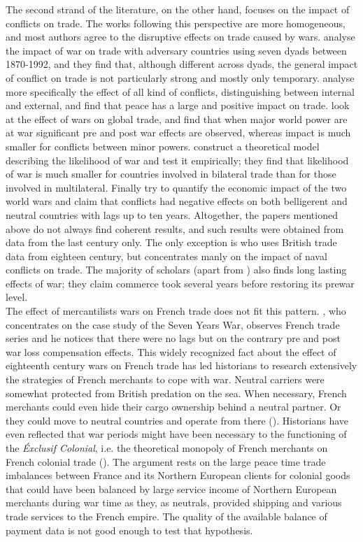 \documentclass[12pt,a4paper,titlepage,english]{article}
\begin{document}
The second strand of the literature, on the other hand, focuses on the impact of conflicts on trade. The works following this perspective are more homogeneous, and most authors agree to the disruptive effects on trade caused by wars. \cite{levy2004trading} analyse the impact of war on trade with adversary countries using seven dyads between 1870-1992, and they find that, although different across dyads, the general impact of conflict on trade is not particularly strong and mostly only temporary. \cite{blomberg2006much} analyse more specifically the effect of all kind of conflicts, distinguishing between internal and external, and find that peace has a large and positive impact on trade. \cite{anderton2001impact} look at the effect of wars on global trade, and find that when major world power are at war significant pre and post war effects are observed, whereas impact is much smaller for conflicts between minor powers. \cite{martin2008make} construct a theoretical model describing the likelihood of war and test it empirically; they find that likelihood of war is much smaller for countries involved in bilateral trade than for those involved in multilateral. Finally \cite{glick2010collateral} try to quantify the economic impact of the two world wars and claim that conflicts had negative effects on both belligerent and neutral countries with lags up to ten years. Altogether, the papers mentioned above do not always find coherent results, and such results were obtained from data from the last century only. The only exception is \cite{rahman2010fighting} who uses British trade data from eighteen century, but concentrates manly on the impact of naval conflicts on trade. The majority of scholars (apart from \cite{levy2004trading}) also finds long lasting effects of war; they claim commerce took several years before restoring its prewar level.\\
The effect of mercantilists wars on French trade does not fit this pattern. \cite{riley_seven_1986}, who concentrates on the case study of the Seven Years War, observes French trade series and he notices that there were no lags but on the contrary pre and post war loss compensation effects. This widely recognized fact about the effect of eighteenth century wars on French trade has led historians to research extensively the strategies of French merchants to cope with war. Neutral carriers were somewhat protected from British predation on the sea. When necessary, French merchants could even hide their cargo ownership behind a neutral partner. Or they could move to neutral countries and operate from there (\cite{marzagalli_was_2016}). Historians have even reflected that war periods might have been necessary to the functioning of the \textit{Éxclusif Colonial}, i.e. the theoretical monopoly of French merchants on French colonial trade (\cite{lespagnol_mondialisation_1997, morineau_vraie_1997, marzagalli_was_2016}). The argument rests on the large peace time trade imbalances between France and its Northern European clients for colonial goods that could have been balanced by large service income of Northern European merchants during war time as they, as neutrals, provided shipping and various trade services to the French empire. The quality of the available balance of payment data is not good enough to test that hypothesis.\\
\end{document}
